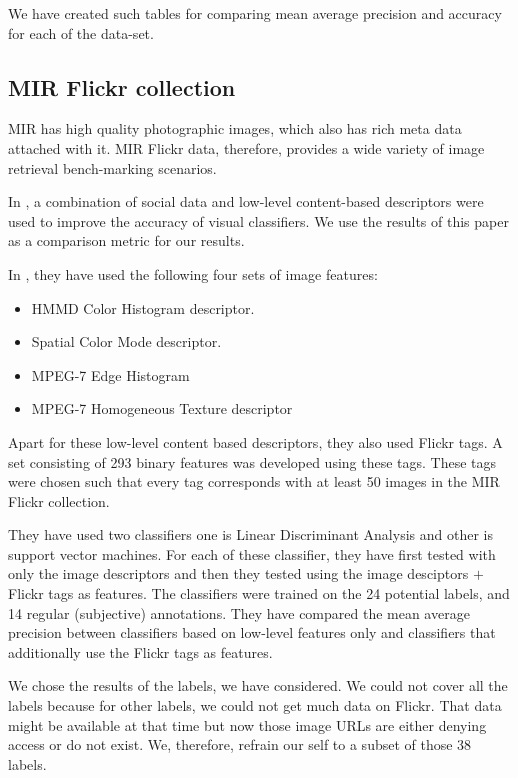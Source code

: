 We have created such tables for comparing mean average precision and accuracy for each of the data-set.
\subsection{MIR Flickr collection }
MIR has high quality photographic images, which also has rich meta data attached with it. MIR Flickr data, therefore,  provides a wide variety of image retrieval bench-marking scenarios.

In \citep{MIRresults}, a combination of social data and low-level content-based descriptors were used to improve the accuracy of visual classifiers. We use the results of this paper as a comparison metric for our results.

In \citep{MIRresults}, they have used the following four sets of image features:
\begin{itemize}
\item HMMD Color Histogram descriptor.
\item Spatial Color Mode descriptor.
\item MPEG-7 Edge Histogram
\item MPEG-7 Homogeneous Texture descriptor
\end{itemize}

Apart for these low-level content based descriptors, they also used Flickr tags.  A set consisting of 293 binary features was developed using these tags. These tags were chosen such that every tag corresponds with at least 50 images in the MIR Flickr collection.

They have used two classifiers one is Linear Discriminant Analysis and other is support vector machines. For each of these classifier, they have first tested with only the image descriptors and then they tested using the image desciptors $+$ Flickr tags as features. The classifiers were trained on the 24 potential labels, and 14 regular (subjective) annotations. They have compared the mean average precision between classifiers based on low-level features only and classifiers that additionally use the Flickr tags as features. 

We chose the results of the labels, we have considered. We could not cover all the labels because for other labels, we could not get much data on Flickr. That data might be available at that time but now those image URLs are either denying access or do not exist. We, therefore, refrain our self to a subset of those 38 labels.

